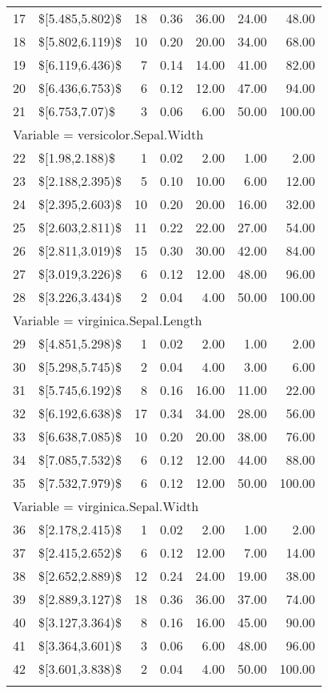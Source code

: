 \documentclass[10pt,a4paper]{article}
\begin{document}
\begin{Schunk}
\begin{table}[H]
\begin{tabular}{rlrrrrr}
  17 & \$[5.485,5.802)\$ &  18 & 0.36 & 36.00 & 24.00 & 48.00 \\ 
  18 & \$[5.802,6.119)\$ &  10 & 0.20 & 20.00 & 34.00 & 68.00 \\ 
  19 & \$[6.119,6.436)\$ &   7 & 0.14 & 14.00 & 41.00 & 82.00 \\ 
  20 & \$[6.436,6.753)\$ &   6 & 0.12 & 12.00 & 47.00 & 94.00 \\ 
  21 & \$[6.753,7.07)\$ &   3 & 0.06 & 6.00 & 50.00 & 100.00 \\ 
   \hline
\multicolumn{7}{l}{Variable = versicolor.Sepal.Width}\\
22 & \$[1.98,2.188)\$ &   1 & 0.02 & 2.00 & 1.00 & 2.00 \\ 
  23 & \$[2.188,2.395)\$ &   5 & 0.10 & 10.00 & 6.00 & 12.00 \\ 
  24 & \$[2.395,2.603)\$ &  10 & 0.20 & 20.00 & 16.00 & 32.00 \\ 
  25 & \$[2.603,2.811)\$ &  11 & 0.22 & 22.00 & 27.00 & 54.00 \\ 
  26 & \$[2.811,3.019)\$ &  15 & 0.30 & 30.00 & 42.00 & 84.00 \\ 
  27 & \$[3.019,3.226)\$ &   6 & 0.12 & 12.00 & 48.00 & 96.00 \\ 
  28 & \$[3.226,3.434)\$ &   2 & 0.04 & 4.00 & 50.00 & 100.00 \\ 
   \hline
\multicolumn{7}{l}{Variable = virginica.Sepal.Length}\\
29 & \$[4.851,5.298)\$ &   1 & 0.02 & 2.00 & 1.00 & 2.00 \\ 
  30 & \$[5.298,5.745)\$ &   2 & 0.04 & 4.00 & 3.00 & 6.00 \\ 
  31 & \$[5.745,6.192)\$ &   8 & 0.16 & 16.00 & 11.00 & 22.00 \\ 
  32 & \$[6.192,6.638)\$ &  17 & 0.34 & 34.00 & 28.00 & 56.00 \\ 
  33 & \$[6.638,7.085)\$ &  10 & 0.20 & 20.00 & 38.00 & 76.00 \\ 
  34 & \$[7.085,7.532)\$ &   6 & 0.12 & 12.00 & 44.00 & 88.00 \\ 
  35 & \$[7.532,7.979)\$ &   6 & 0.12 & 12.00 & 50.00 & 100.00 \\ 
   \hline
\multicolumn{7}{l}{Variable = virginica.Sepal.Width}\\
36 & \$[2.178,2.415)\$ &   1 & 0.02 & 2.00 & 1.00 & 2.00 \\ 
  37 & \$[2.415,2.652)\$ &   6 & 0.12 & 12.00 & 7.00 & 14.00 \\ 
  38 & \$[2.652,2.889)\$ &  12 & 0.24 & 24.00 & 19.00 & 38.00 \\ 
  39 & \$[2.889,3.127)\$ &  18 & 0.36 & 36.00 & 37.00 & 74.00 \\ 
  40 & \$[3.127,3.364)\$ &   8 & 0.16 & 16.00 & 45.00 & 90.00 \\ 
  41 & \$[3.364,3.601)\$ &   3 & 0.06 & 6.00 & 48.00 & 96.00 \\ 
  42 & \$[3.601,3.838)\$ &   2 & 0.04 & 4.00 & 50.00 & 100.00 \\ 
   \hline
\multicolumn{7}{l}{}\\
\end{tabular}
\end{table}\end{Schunk}
\end{document}
